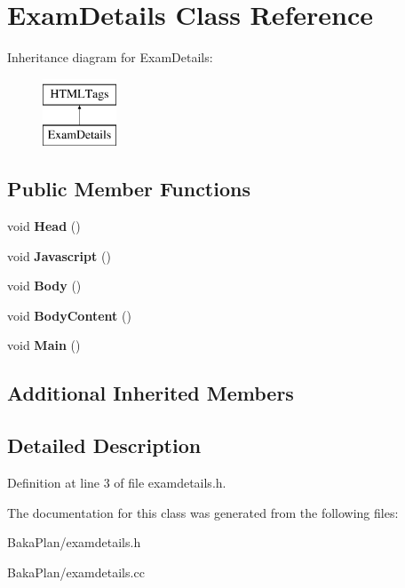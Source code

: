 \hypertarget{classExamDetails}{\section{Exam\-Details Class Reference}
\label{classExamDetails}
}
Inheritance diagram for Exam\-Details\-:\begin{figure}[H]
\begin{center}
\leavevmode
\includegraphics[height=2.000000cm]{classExamDetails}
\end{center}
\end{figure}
\subsection*{Public Member Functions}
\begin{DoxyCompactItemize}
\item 
\hypertarget{classExamDetails_a356f72609abf6d93a6b173af5f28f4db}{void {\bfseries Head} ()}\label{classExamDetails_a356f72609abf6d93a6b173af5f28f4db}

\item 
\hypertarget{classExamDetails_a4925302cb9555f1cadec37872367b0a2}{void {\bfseries Javascript} ()}\label{classExamDetails_a4925302cb9555f1cadec37872367b0a2}

\item 
\hypertarget{classExamDetails_ae8a4c439804372417bcd37976a185626}{void {\bfseries Body} ()}\label{classExamDetails_ae8a4c439804372417bcd37976a185626}

\item 
\hypertarget{classExamDetails_a357e0a4b9116a69af06bd312c809f84e}{void {\bfseries Body\-Content} ()}\label{classExamDetails_a357e0a4b9116a69af06bd312c809f84e}

\item 
\hypertarget{classExamDetails_a9ae3ecade5e455f7b71f4ef46febe71b}{void {\bfseries Main} ()}\label{classExamDetails_a9ae3ecade5e455f7b71f4ef46febe71b}

\end{DoxyCompactItemize}
\subsection*{Additional Inherited Members}


\subsection{Detailed Description}


Definition at line 3 of file examdetails.\-h.



The documentation for this class was generated from the following files\-:\begin{DoxyCompactItemize}
\item 
Baka\-Plan/examdetails.\-h\item 
Baka\-Plan/examdetails.\-cc\end{DoxyCompactItemize}
